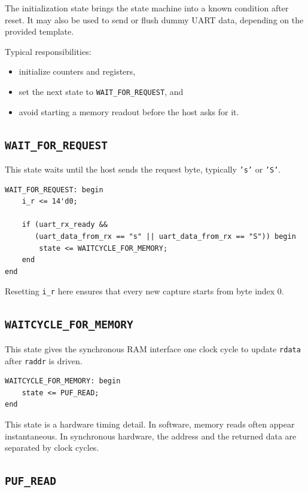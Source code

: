 \documentclass[11pt,a4paper]{article}
\begin{document}
The initialization state brings the state machine into a known condition after reset. It may also be used to send or flush dummy UART data, depending on the provided template.

Typical responsibilities:

\begin{itemize}
  \item initialize counters and registers,
  \item set the next state to \texttt{WAIT\_FOR\_REQUEST}, and
  \item avoid starting a memory readout before the host asks for it.
\end{itemize}

\subsection{\texttt{WAIT\_FOR\_REQUEST}}

This state waits until the host sends the request byte, typically \texttt{'s'} or \texttt{'S'}.

\begin{lstlisting}
WAIT_FOR_REQUEST: begin
    i_r <= 14'd0;

    if (uart_rx_ready &&
       (uart_data_from_rx == "s" || uart_data_from_rx == "S")) begin
        state <= WAITCYCLE_FOR_MEMORY;
    end
end
\end{lstlisting}

Resetting \texttt{i\_r} here ensures that every new capture starts from byte index 0.

\subsection{\texttt{WAITCYCLE\_FOR\_MEMORY}}

This state gives the synchronous RAM interface one clock cycle to update \texttt{rdata} after \texttt{raddr} is driven.

\begin{lstlisting}
WAITCYCLE_FOR_MEMORY: begin
    state <= PUF_READ;
end
\end{lstlisting}

This state is a hardware timing detail. In software, memory reads often appear instantaneous. In synchronous hardware, the address and the returned data are separated by clock cycles.

\subsection{\texttt{PUF\_READ}}
\end{document}
